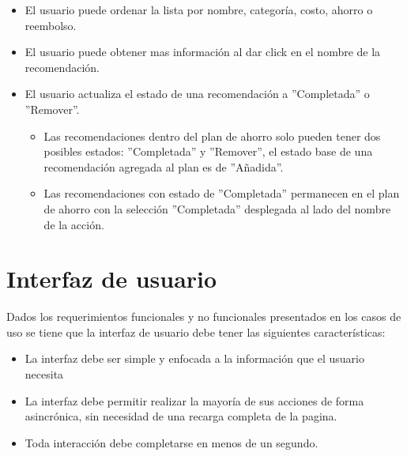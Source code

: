 \begin{usecase}
{\begin{itemize}
\begin{itemize}
      \item El sistema debe indicar que la lista de recomendaciones es el plan
        de ahorro.
      \item El usuario puede agregar mas recomendaciones desde la lista de
        recomendaciones, cuando se añade una recomendación esta solamente es
        visible en el plan de ahorro ya no debe de aparecer en la lista de
        recomendaciones
      \item El usuario puede remover recomendaciones de su plan seleccionando
        ''Remover del plan'' en un menú desplegable al lado del nombre de la
        acción.
      \end{itemize}
    \item El usuario puede ordenar la lista por nombre, categoría, costo, ahorro
      o reembolso.
    \item El usuario puede obtener mas información al dar click en el nombre
      de la recomendación.
    \item El usuario actualiza el estado de una recomendación a ''Completada''
      o ''Remover''.
      \begin{itemize}
      \item Las recomendaciones dentro del plan de ahorro solo pueden tener
        dos posibles estados: ''Completada'' y ''Remover'', el estado base
        de una recomendación agregada al plan es de ''Añadida''.
      \item Las recomendaciones con estado de ''Completada'' permanecen
        en el plan de ahorro con la selección ''Completada'' desplegada
        al lado del nombre de la acción.
      \end{itemize}
    \end{itemize}
  }
\end{usecase}

\section{Interfaz de usuario}

Dados los requerimientos funcionales y no funcionales presentados en los
casos de uso se tiene que la interfaz de usuario debe tener las siguientes
características:

\begin{itemize}
\item La interfaz debe ser simple y enfocada a la información que el
  usuario necesita
\item La interfaz debe permitir realizar la mayoría de sus
  acciones de forma asincrónica, sin necesidad de una recarga completa de
  la pagina.
\item Toda interacción debe completarse en menos de un segundo.
\end{itemize}

